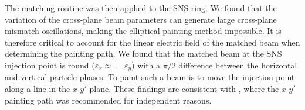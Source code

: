 The matching routine was then applied to the SNS ring. We found that the variation of the cross-plane beam parameters can generate large cross-plane mismatch oscillations, making the elliptical painting method impossible. It is therefore critical to account for the linear electric field of the matched beam when determining the painting path. We found that the matched beam at the SNS injection point is round ($\varepsilon_x \approx = \varepsilon_y$) with a $\pi / 2$ difference between the horizontal and vertical particle phases. To paint such a beam is to move the injection point along a line in the $x$-$y'$ plane. These findings are consistent with \cite{Holmes2018}, where the $x$-$y'$ painting path was recommended for independent reasons.
